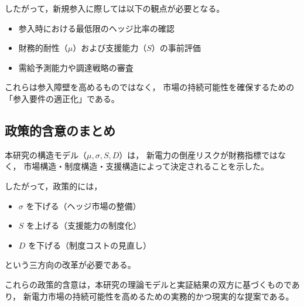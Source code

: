 したがって，新規参入に際しては以下の観点が必要となる。

\begin{itemize}
    \item 参入時における最低限のヘッジ比率の確認
    \item 財務的耐性（$\mu$）および支援能力（$S$）の事前評価
    \item 需給予測能力や調達戦略の審査
\end{itemize}

これらは参入障壁を高めるものではなく，
市場の持続可能性を確保するための「参入要件の適正化」である。

\subsection{政策的含意のまとめ}

本研究の構造モデル（$\mu, \sigma, S, D$）は，
新電力の倒産リスクが財務指標ではなく，
市場構造・制度構造・支援構造によって決定されることを示した。

したがって，政策的には，

\begin{itemize}
    \item $\sigma$ を下げる（ヘッジ市場の整備）
    \item $S$ を上げる（支援能力の制度化）
    \item $D$ を下げる（制度コストの見直し）
\end{itemize}

という三方向の改革が必要である。

これらの政策的含意は，本研究の理論モデルと実証結果の双方に基づくものであり，
新電力市場の持続可能性を高めるための実務的かつ現実的な提案である。
